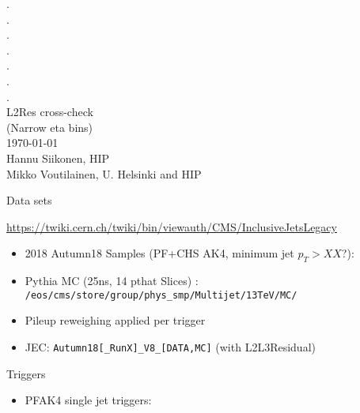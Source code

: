 \documentclass[landscape,10pt]{beamer} %
\begin{document}
\begin{centering}
{. }\\
{. }\\
{. }\\
{. }\\
{. }\\
{. }\\
{. }\\
L2Res cross-check\\
(Narrow eta bins)\\
\today\\
Hannu Siikonen, HIP\\
Mikko Voutilainen, U. Helsinki and HIP\\
\end{centering}

\newpage
Data sets

\url{https://twiki.cern.ch/twiki/bin/viewauth/CMS/InclusiveJetsLegacy}

\begin{itemize}
\item 2018 Autumn18 Samples (PF+CHS AK4, minimum jet $p_T>XX$?):
\item Pythia MC (25ns, 14 pthat Slices) : {\small\verb|/eos/cms/store/group/phys_smp/Multijet/13TeV/MC/|}
\item Pileup reweighing applied per trigger
\item JEC: \verb|Autumn18[_RunX]_V8_[DATA,MC]| (with L2L3Residual)
\end{itemize}

Triggers
\begin{itemize}
\item PFAK4 single jet triggers:
\end{itemize}

\newpage
\end{document}
